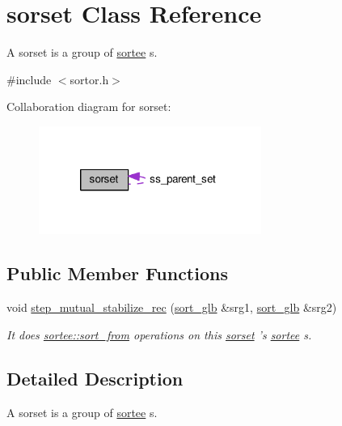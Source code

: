 \hypertarget{classsorset}{\section{sorset Class Reference}
\label{classsorset}
}


A sorset is a group of \hyperlink{classsortee}{sortee} s.  




{\ttfamily \#include $<$sortor.\+h$>$}



Collaboration diagram for sorset\+:\nopagebreak
\begin{figure}[H]
\begin{center}
\leavevmode
\includegraphics[width=206pt]{d0/d4c/classsorset__coll__graph}
\end{center}
\end{figure}
\subsection*{Public Member Functions}
\begin{DoxyCompactItemize}
\item 
void \hyperlink{classsorset_a9a85b9412bc1fc5bea86d416e52b55c7}{step\+\_\+mutual\+\_\+stabilize\+\_\+rec} (\hyperlink{classsort__glb}{sort\+\_\+glb} \&srg1, \hyperlink{classsort__glb}{sort\+\_\+glb} \&srg2)
\begin{DoxyCompactList}\small\item\em It does \hyperlink{classsortee_a5cc113e22e62dfcb3869c2786ae5345e}{sortee\+::sort\+\_\+from} operations on this \hyperlink{classsorset}{sorset} 's \hyperlink{classsortee}{sortee} s. \end{DoxyCompactList}\end{DoxyCompactItemize}


\subsection{Detailed Description}
A sorset is a group of \hyperlink{classsortee}{sortee} s. 

